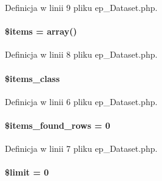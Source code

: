 Definicja w linii 9 pliku ep\-\_\-\-Dataset.\-php.

\hypertarget{classep___dataset_a737abdef83dabb219182c1e88887c6c3}{
\paragraph[{\$items}]{\setlength{\rightskip}{0pt plus 5cm}\$items = array()}}\label{classep___dataset_a737abdef83dabb219182c1e88887c6c3}


Definicja w linii 8 pliku ep\-\_\-\-Dataset.\-php.

\hypertarget{classep___dataset_aa6325e5d913d5f63195525aa6a082bc4}{
\paragraph[{\$items\-\_\-class}]{\setlength{\rightskip}{0pt plus 5cm}\$items\-\_\-class}}\label{classep___dataset_aa6325e5d913d5f63195525aa6a082bc4}


Definicja w linii 6 pliku ep\-\_\-\-Dataset.\-php.

\hypertarget{classep___dataset_a65539c516b1dfa0af15bb2bab190193b}{
\paragraph[{\$items\-\_\-found\-\_\-rows}]{\setlength{\rightskip}{0pt plus 5cm}\$items\-\_\-found\-\_\-rows = 0}}\label{classep___dataset_a65539c516b1dfa0af15bb2bab190193b}


Definicja w linii 7 pliku ep\-\_\-\-Dataset.\-php.

\hypertarget{classep___dataset_ae05862a0294251c88629b141b5ce329a}{
\paragraph[{\$limit}]{\setlength{\rightskip}{0pt plus 5cm}\$limit = 0}}\label{classep___dataset_ae05862a0294251c88629b141b5ce329a}


